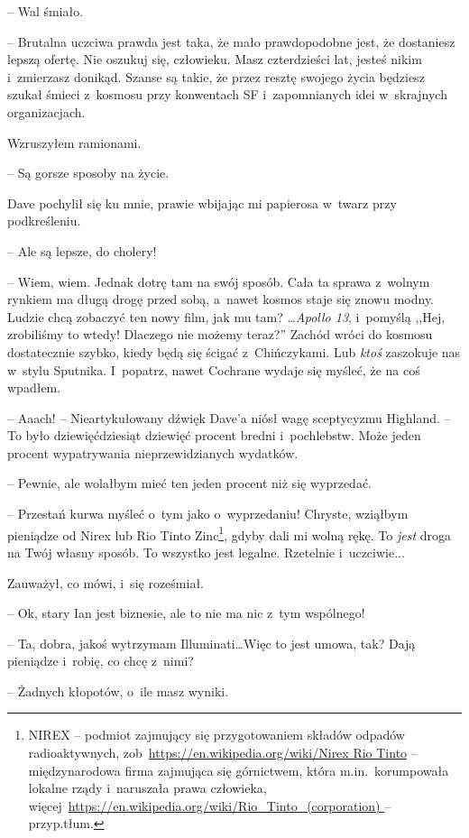 \documentclass[oneside,polish,11pt,sfheadings]{mwbk}
\begin{document}
-- Wal śmiało.

-- Brutalna uczciwa prawda jest taka, że mało prawdopodobne jest, że
dostaniesz lepszą ofertę. Nie oszukuj się, człowieku. Masz czterdzieści
lat, jesteś nikim i~zmierzasz donikąd. Szanse są takie, że przez resztę
swojego życia będziesz szukał śmieci z~kosmosu przy konwentach SF i~zapomnianych idei w~skrajnych organizacjach.

Wzruszyłem ramionami. 

-- Są gorsze sposoby na życie.

Dave pochylił się ku mnie, prawie wbijając mi papierosa w~twarz przy
podkreśleniu. 

-- Ale są lepsze, do cholery!

-- Wiem, wiem. Jednak dotrę tam na swój sposób. Cała ta sprawa z~wolnym
rynkiem ma długą drogę przed sobą, a~nawet kosmos staje się znowu modny.
Ludzie chcą zobaczyć ten nowy film, jak mu tam? \ldots \emph{Apollo 13}, i~pomyślą ,,Hej, zrobiliśmy to wtedy! Dlaczego nie możemy teraz?'' Zachód
wróci do kosmosu dostatecznie szybko, kiedy będą się ścigać z~Chińczykami. Lub \emph{ktoś} zaszokuje nas w~stylu Sputnika. I~popatrz,
nawet Cochrane wydaje się myśleć, że na coś wpadłem.

-- Aaach! -- Nieartykułowany dźwięk Dave'a niósł wagę sceptycyzmu
Highland. -- To było dziewięćdziesiąt dziewięć procent bredni i~pochlebstw. Może jeden procent wypatrywania nieprzewidzianych wydatków.

-- Pewnie, ale wolałbym mieć ten jeden procent niż się wyprzedać.

-- Przestań kurwa myśleć o~tym jako o~wyprzedaniu! Chryste, wziąłbym
pieniądze od Nirex lub Rio Tinto Zinc\footnote{NIREX -- podmiot zajmujący się przygotowaniem składów odpadów
radioaktywnych, zob~\url{https://en.wikipedia.org/wiki/Nirex
Rio Tinto} -- międzynarodowa firma zajmująca się górnictwem, która m.in.~korumpowała lokalne rządy i~naruszała prawa człowieka,
więcej~\url{https://en.wikipedia.org/wiki/Rio_Tinto_(corporation)
} -- przyp.tłum.}, gdyby dali mi wolną rękę. To \emph{jest} droga na Twój własny sposób. To wszystko
jest legalne. Rzetelnie i~uczciwie...

Zauważył, co mówi, i~się roześmiał. 

-- Ok, stary Ian jest biznesie, ale
to nie ma nic z~tym wspólnego!

-- Ta, dobra, jakoś wytrzymam Illuminati\ldots Więc to jest umowa, tak? Dają
pieniądze i~robię, co chcę z~nimi?

-- Żadnych kłopotów, o~ile masz wyniki.
\end{document}
